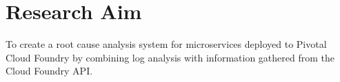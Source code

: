 \chapter{Research Aim}
To create a root cause analysis system for microservices deployed to Pivotal Cloud Foundry by combining log analysis with information gathered from the Cloud Foundry API.